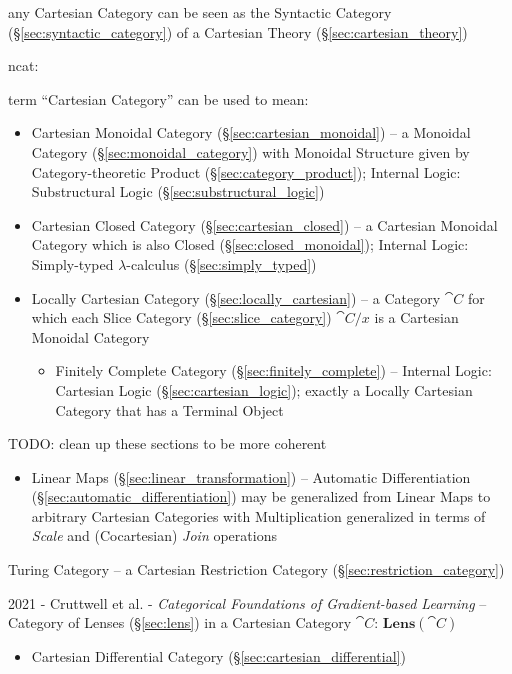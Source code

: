 any Cartesian Category can be seen as the Syntactic Category
(\S\ref{sec:syntactic_category}) of a Cartesian Theory
(\S\ref{sec:cartesian_theory})

ncat:

term ``Cartesian Category'' can be used to mean:
\begin{itemize}
  \item Cartesian Monoidal Category (\S\ref{sec:cartesian_monoidal}) --
    a Monoidal Category (\S\ref{sec:monoidal_category}) with Monoidal Structure
    given by Category-theoretic Product (\S\ref{sec:category_product});
    Internal Logic: Substructural Logic (\S\ref{sec:substructural_logic})
  \item Cartesian Closed Category (\S\ref{sec:cartesian_closed}) -- a Cartesian
    Monoidal Category which is also Closed
    (\S\ref{sec:closed_monoidal});
    Internal Logic: Simply-typed $\lambda$-calculus (\S\ref{sec:simply_typed})
  \item Locally Cartesian Category (\S\ref{sec:locally_cartesian}) -- a
    Category $\cat{C}$ for which each Slice Category
    (\S\ref{sec:slice_category}) $\cat{C} / x$ is a Cartesian Monoidal Category
  \begin{itemize}
    \item Finitely Complete Category (\S\ref{sec:finitely_complete}) --
      Internal Logic: Cartesian Logic (\S\ref{sec:cartesian_logic}); exactly a
      Locally Cartesian Category that has a Terminal Object
  \end{itemize}
\end{itemize}
TODO: clean up these sections to be more coherent

\begin{itemize}
  \item Linear Maps (\S\ref{sec:linear_transformation}) -- Automatic
    Differentiation (\S\ref{sec:automatic_differentiation}) may be generalized
    from Linear Maps to arbitrary Cartesian Categories with Multiplication
    generalized in terms of \emph{Scale} and (Cocartesian) \emph{Join}
    operations
\end{itemize}

\fist Turing Category -- a Cartesian Restriction Category
(\S\ref{sec:restriction_category})

2021 - Cruttwell et al. - \emph{Categorical Foundations of Gradient-based
Learning} -- Category of Lenses (\S\ref{sec:lens}) in a Cartesian Category
$\cat{C}$: $\mathbf{Lens}(\cat{C})$

\begin{itemize}
  \item Cartesian Differential Category (\S\ref{sec:cartesian_differential})
\end{itemize}



